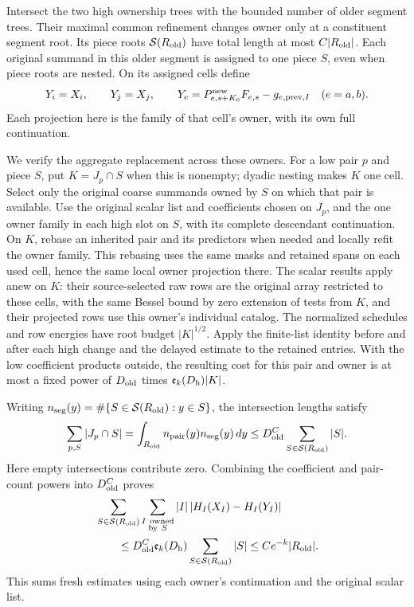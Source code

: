 Intersect the two high ownership trees with the bounded number of
older segment trees.  Their maximal common refinement changes
owner only at a constituent segment root.  Its piece roots
\(\mathcal S(R_{\rm old})\) have total length at most
\(C|R_{\rm old}|\).  Each original summand in this older segment
is assigned to one piece \(S\), even when piece roots are nested.
On its assigned cells define
\begin{equation}
 Y_i=X_i,\qquad Y_j=X_j,\qquad
 Y_e=P^{\rm new}_{e,s+K_0}F_{e,s}
          -g_{e,\mathrm{prev},I}\quad(e=a,b).                  \label{eq:hbase-Y}
\end{equation}
Each projection here is the family of that cell's owner, with its
own full continuation.

We verify the aggregate replacement across these owners.  For a
low pair \(p\) and piece \(S\), put \(K=J_p\cap S\) when this is
nonempty; dyadic nesting makes \(K\) one cell.  Select only the
original coarse summands owned by \(S\) on which that pair is
available.  Use the original scalar list and coefficients chosen
on \(J_p\), and the one owner family in each high slot on \(S\),
with its complete descendant continuation.  On \(K\), rebase an
inherited pair and its predictors when needed and locally refit
the owner family.  This rebasing uses the same masks and retained spans
on each used cell, hence the same local owner projection there.
The scalar results apply anew on \(K\):
their source-selected raw rows are the original array restricted
to these cells, with the same Bessel bound by zero extension of
tests from \(K\), and their projected rows use this owner's
individual catalog.  The normalized schedules and row energies
have root budget \(|K|^{1/2}\).  Apply the finite-list identity
before and after each high change and the delayed estimate to the
retained entries.  With the low coefficient products outside,
the resulting cost for this pair and owner is at most a fixed
power of \(D_{\rm old}\) times
\(\mathfrak e_k(D_{\rm h})|K|\).

Writing \(n_{\rm seg}(y)=\#\{S\in\mathcal S(R_{\rm old}):y\in S\}\),
the intersection lengths satisfy
\[
 \sum_{p,S}|J_p\cap S|
 =\int_{R_{\rm old}}n_{\rm pair}(y)n_{\rm seg}(y)\,dy
 \le D_{\rm old}^C\sum_{S\in\mathcal S(R_{\rm old})}|S|.
\]
Here empty intersections contribute zero.  Combining the coefficient
and pair-count powers into \(D_{\rm old}^C\) proves
\begin{align}
 &\sum_{S\in\mathcal S(R_{\rm old})}
     \sum_{\substack{I\ {\rm owned}\\{\rm by}\ S}}
       |I|\,|H_I(X_I)-H_I(Y_I)|
 \nonumber\\
 &\qquad\le
 D_{\rm old}^C\mathfrak e_k(D_{\rm h})
       \sum_{S\in\mathcal S(R_{\rm old})}|S|
 \le Ce^{-k}|R_{\rm old}|.                                    \label{eq:hbase-high-errors}
\end{align}
This sums fresh estimates using each owner's continuation and the
original scalar list.

